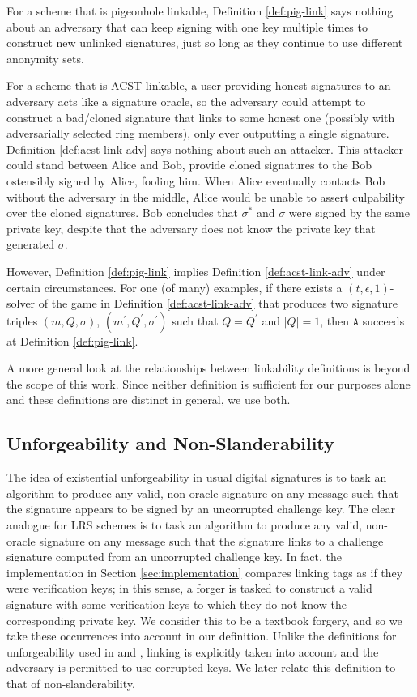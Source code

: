 \documentclass{llncs}
\newcommand{\A}{\texttt{A}}
\begin{document}
For a scheme that is pigeonhole linkable, Definition \ref{def:pig-link} says nothing about an adversary that can keep signing with one key multiple times to construct new unlinked signatures, just so long as they continue to use different anonymity sets.

For a scheme that is ACST linkable, a user providing honest signatures to an adversary acts like a signature oracle, so the adversary could  attempt to construct a bad/cloned signature that links to some honest one (possibly with adversarially selected ring members), only ever outputting a single signature. Definition \ref{def:acst-link-adv} says nothing about such an attacker. This attacker could stand between Alice and Bob, provide cloned signatures to the Bob ostensibly signed by Alice, fooling him. When Alice eventually contacts Bob without the adversary in the middle, Alice would be unable to assert culpability over the cloned signatures. Bob concludes that $\sigma^*$ and $\sigma$ were signed by the same private key, despite that the adversary does not know the private key that generated $\sigma$.

However, Definition \ref{def:pig-link} implies Definition \ref{def:acst-link-adv} under certain circumstances.  For one (of many) examples, if there exists a $(t, \epsilon, 1)$-solver of the game in Definition \ref{def:acst-link-adv} that produces two signature triples $(m, Q, \sigma)$, $(m^\prime, Q^\prime, \sigma^\prime)$ such that $Q = Q^\prime$ and $\left|Q\right| = 1$, then $\A$ succeeds at Definition \ref{def:pig-link}.

A more general look at the relationships between linkability definitions is beyond the scope of this work. Since neither definition is sufficient for our purposes alone and these definitions are distinct in general, we use both.


\subsection{Unforgeability and Non-Slanderability}

The idea of existential unforgeability in usual digital signatures is to task an algorithm to produce any valid, non-oracle signature on any message such that the signature appears to be signed by an uncorrupted challenge key. The clear analogue for LRS schemes is to task an algorithm to produce any valid, non-oracle signature on any message such that the signature links to a challenge signature computed from an uncorrupted challenge key. In fact, the implementation in Section \ref{sec:implementation} compares linking tags as if they were verification keys; in this sense, a forger is tasked to construct a valid signature with some verification keys to which they do not know the corresponding private key. We consider this to be a textbook forgery, and so we take these occurrences into account in our definition. Unlike the definitions for unforgeability used in \cite{au2006short} and \cite{backes2019ring}, linking is explicitly taken into account and the adversary is permitted to use corrupted keys. We later relate this definition to that of non-slanderability.
\end{document}
